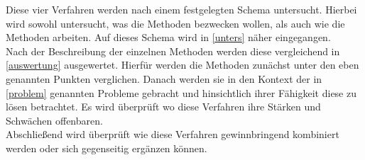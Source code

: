 Diese vier Verfahren werden nach einem festgelegten Schema untersucht. Hierbei wird sowohl untersucht, was die Methoden bezwecken wollen, als auch wie die Methoden arbeiten. Auf dieses Schema wird in \ref{unters} näher eingegangen. \\

Nach der Beschreibung der einzelnen Methoden werden diese vergleichend in \ref{auswertung} ausgewertet. Hierf\"ur werden die Methoden zun\"achst unter den eben genannten Punkten verglichen. Danach werden sie in den Kontext der in \ref{problem} genannten Probleme gebracht und hinsichtlich ihrer F\"ahigkeit diese zu l\"osen betrachtet. Es wird \"uberpr\"uft wo diese Verfahren ihre St\"arken und Schw\"achen offenbaren. \\

Abschlie\ss{}end wird \"uberpr\"uft wie diese Verfahren gewinnbringend kombiniert werden oder sich gegenseitig erg\"anzen k\"onnen. \\
